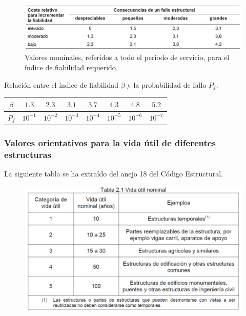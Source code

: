 \begin{figure}[H]
    \centering
    \includegraphics[width = 0.5 \textwidth]{Imagenes/Fiabilidad estructural - Indice de fiabilidad requerido segun el CTE.png}
    \caption{Valores nominales, referidos a todo el periodo de servicio, para el índice de fiabilidad requerido.}
\end{figure}

Relación entre el índice de fiabilidad $\beta$ y la probabilidad de fallo $P_f$.

\begin{table}[H]
    \centering
    \begin{tabular}{|c|c|c|c|c|c|c|c|}
        \hline
        $\beta$ & $1.3$ & $2.3$ & $3.1$ & $3.7$ & $4.3$ & $4.8$ & $5.2$ \\
        \hline
        $P_f$ & $10^{-1}$ & $10^{-2}$ & $10^{-3}$ & $10^{-4}$ & $10^{-5}$ & $10^{-6}$ & $10^{-7}$ \\
        \hline
    \end{tabular}
\end{table}


\subsubsection{Valores orientativos para la vida útil de diferentes estructuras}
La siguiente tabla se ha extraído del anejo 18 del Código Estructural.

\begin{figure}[H]
    \centering
    \includegraphics[width = 0.5 \textwidth]{Imagenes/Fiabilidad estructural - Vida util nominal.png}
\end{figure}


